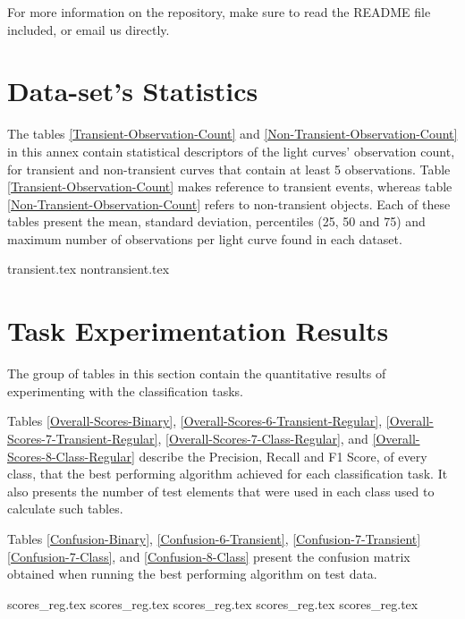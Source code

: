 \documentclass[a4paper,fleqn,usenatbib]{mnras}
\begin{document}
For more information on the repository, make sure to read the README file included, or email us directly.

\section{Data-set's Statistics}

The tables \ref{Transient-Observation-Count} and \ref{Non-Transient-Observation-Count} in this annex contain statistical descriptors of the light curves' observation count, for transient and non-transient curves that contain at least 5 observations.
Table \ref{Transient-Observation-Count} makes reference to transient events, whereas table \ref{Non-Transient-Observation-Count} refers to non-transient objects. 
Each of these tables present the mean, standard deviation, percentiles (25, 50 and 75) and maximum number of observations per light curve found in each dataset.

\newpage
\pagebreak

{transient.tex}
{nontransient.tex}

\section{Task Experimentation Results}

The group of tables in this section contain the quantitative results of experimenting with the classification tasks. 

Tables \ref{Overall-Scores-Binary}, \ref{Overall-Scores-6-Transient-Regular}, \ref{Overall-Scores-7-Transient-Regular}, \ref{Overall-Scores-7-Class-Regular}, and  \ref{Overall-Scores-8-Class-Regular} describe the Precision, Recall and F1 Score, of every class, that the best performing algorithm achieved for each classification task. It also presents the number of test elements that were used in each class used to calculate such tables. 

Tables \ref{Confusion-Binary}, \ref{Confusion-6-Transient}, \ref{Confusion-7-Transient} \ref{Confusion-7-Class}, and  \ref{Confusion-8-Class} present the confusion matrix obtained when running the best performing algorithm on test data. 

\newpage
\pagebreak



{scores_reg.tex}
{scores_reg.tex}
{scores_reg.tex}
{scores_reg.tex}
{scores_reg.tex}
\end{document}
